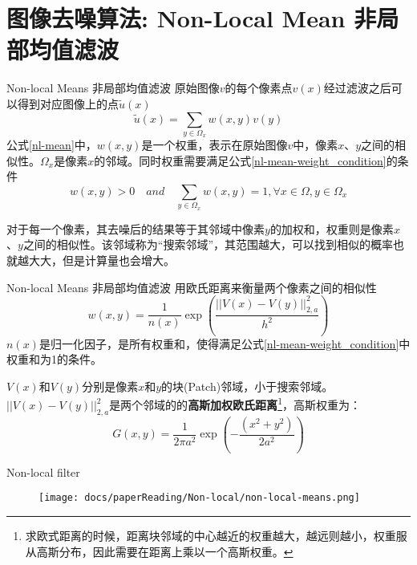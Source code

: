 \section{图像去噪算法: Non-Local Mean 非局部均值滤波}



\begin{frame}{Non-local Means 非局部均值滤波}
    原始图像$v$的每个像素点$v(x)$经过滤波之后可以得到对应图像上的点$\tilde{u}(x)$
    \begin{equation}
        \tilde{u}(x)=\sum_{y\in \Omega_x} w(x,y)v(y)
        \label{nl-mean}
    \end{equation}    
    公式\ref{nl-mean}中，$w(x,y)$是一个权重，表示在原始图像$v$中，像素$x$、$y$之间的相似性。$\Omega_x$是像素$x$的邻域。同时权重需要满足公式\ref{nl-mean-weight_condition}的条件
    \begin{equation}
        w(x,y)>0\quad and\quad \sum_{y\in \Omega_x} w(x,y)=1,\forall x\in \Omega,y\in \Omega_x
        \label{nl-mean-weight_condition}
    \end{equation}

    对于每一个像素，其去噪后的结果等于其邻域中像素$y$的加权和，权重则是像素$x$、$y$之间的相似性。该邻域称为“搜索邻域”，其范围越大，可以找到相似的概率也就越大大，但是计算量也会增大。
\end{frame}

\begin{frame}{Non-local Means 非局部均值滤波}
    用欧氏距离来衡量两个像素之间的相似性
    \begin{equation}
        w(x,y)=\frac{1}{n(x)} \exp(\frac{||V(x)-V(y)||_{2,a}^2}{h^2})
    \end{equation}
    $n(x)$是归一化因子，是所有权重和，使得满足公式\ref{nl-mean-weight_condition}中权重和为1的条件。

    $V(x)$和$V(y)$分别是像素$x$和$y$的块(Patch)邻域，小于搜索邻域。
    $||V(x)-V(y)||_{2,a}^2$是两个邻域的的\textbf{高斯加权欧氏距离}\footnote{求欧式距离的时候，距离块邻域的中心越近的权重越大，越远则越小，权重服从高斯分布，因此需要在距离上乘以一个高斯权重。}，高斯权重为：    
    \begin{equation}
        G(x,y)=\frac{1}{2\pi a^2}\exp(-\frac{(x^2+y^2)}{2a^2})
    \end{equation}
\end{frame}


\begin{frame}{Non-local filter}
    \begin{figure}
        \centering
        \texttt{[image: docs/paperReading/Non-local/non-local-means.png]}
    \end{figure}
\end{frame}

